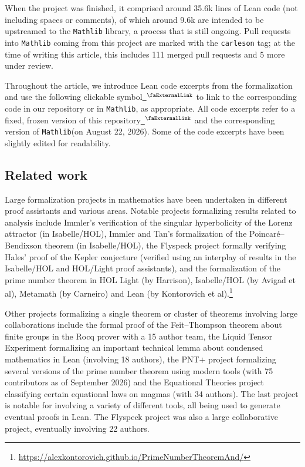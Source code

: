 \documentclass[12pt, reqno]{amsart}
\let\lean\lstinline
\newcommand{\mathlib}{\texttt{Mathlib}\xspace}
\newcommand{\extlink}{~\ensuremath{{}^\text{\faExternalLink}}}
\theoremstyle{definition}
\theoremstyle{plain}
\begin{document}
When the project was finished, it comprised around 35.6k lines of Lean code (not including spaces or comments), of which around 9.6k are intended to be upstreamed to the \mathlib library, a process that is still ongoing. Pull requests into \mathlib coming from this project are marked with the \lean{carleson} tag; at the time of writing this article, this includes 111 merged pull requests and 5 more under review.

Throughout the article, we introduce Lean code excerpts from the formalization and use the following clickable symbol\href{https://github.com/fpvandoorn/carleson/blob/AFM-frozen/Carleson/Defs.lean#L298-L300}{\extlink} to link to the corresponding code in our repository or in \mathlib, as appropriate. All code excerpts refer to a fixed, frozen version of this repository\href{https://github.com/fpvandoorn/carleson/tree/AFM-frozen}{\extlink} and the corresponding version of \mathlib (on August 22, 2026).
Some of the code excerpts have been slightly edited for readability.

\subsection{Related work}\label{subsec:rel_work}

Large formalization projects in mathematics have been undertaken in different proof assistants and various areas.
Notable projects formalizing results related to analysis include Immler's verification of the singular hyperbolicity of the Lorenz attractor \cite{ImmlerLorentzSolver} (in Isabelle/HOL),
Immler and Tan's formalization of the Poincaré--Bendixson theorem \cite{ImmlerTanPoincareBendixon} (in Isabelle/HOL),
the Flyspeck project \cite{FlyspeckComplete} formally verifying Hales' proof of the Kepler conjecture (verified using an interplay of results in the Isabelle/HOL and HOL/Light proof assistants), and the formalization of the prime number theorem in HOL Light \cite{HarrisonPNT} (by Harrison), Isabelle/HOL \cite{AvigadPNT} (by Avigad et al), Metamath \cite{CarneiroPNT} (by Carneiro) and Lean (by Kontorovich et al).\footnote{\url{https://alexkontorovich.github.io/PrimeNumberTheoremAnd/}}

Other projects formalizing a single theorem or cluster of theorems involving large collaborations include the formal proof of the Feit--Thompson theorem about finite groups in the Rocq prover \cite{OddOrderTheorem} with a 15 author team, the Liquid Tensor Experiment formalizing an important technical lemma about condensed mathematics in Lean \cites{LTEDefinitions,LTEFinal} (involving 18 authors), the PNT$+$ project formalizing several versions of the prime number theorem using modern tools (with 75 contributors as of September 2026)
and the Equational Theories project classifying certain equational laws on magmas \cite{tao2025equationaltheories} (with 34 authors).
The last project is notable for involving a variety of different tools,
all being used to generate eventual proofs in Lean.
The Flyspeck project was also a large collaborative project, eventually involving 22 authors.
\end{document}
